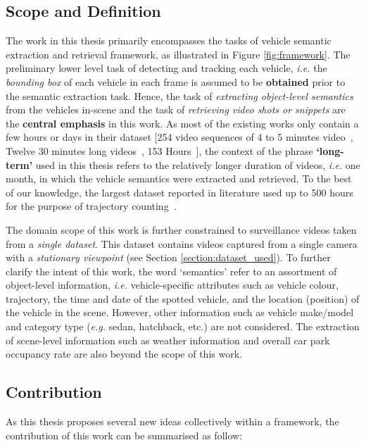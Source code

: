 \subsection{Scope and Definition}
\label{subsec:scope}
The work in this thesis primarily encompasses the tasks 
of vehicle semantic extraction and retrieval framework, as illustrated in Figure \ref{fig:framework}. The preliminary lower level task of detecting and tracking each vehicle, \emph{i.e.} the \textit{bounding box} of each vehicle in each frame is assumed to be \textbf{obtained} prior to the semantic extraction task.
Hence, the task of \textit{extracting object-level semantics} from the vehicles in-scene and the task of \textit{retrieving video shots or snippets} are the \textbf{central emphasis} in this work.
As most of the existing works only contain a few hours or days in their dataset [254 video sequences of 4 to 5 minutes video~\cite{liu2016highway}, Twelve 30 minutes long videos~\cite{marmol2016quickspot}, 153 Hours~\cite{ren2018learning}], the context of the phrase \textbf{`long-term'} used in this thesis refers to the relatively longer duration of videos, \emph{i.e.} one month, in which the vehicle semantics were extracted and retrieved. To the best of our knowledge, the largest dataset reported in literature used up to 500 hours for the purpose of trajectory counting~\cite{lessard2016countingapp}.


The domain scope of this work is further constrained to surveillance videos taken from a \textit{single dataset}. This dataset contains videos captured from a single camera with a \textit{stationary viewpoint} (see Section \ref{section:dataset_used}). To further clarify the intent of this work, the word `semantics' refer to an assortment of object-level information, \emph{i.e.} vehicle-specific attributes such as vehicle colour, trajectory, the time and date of the spotted vehicle, and the location (position) of the vehicle in the scene. However, other information 
such as vehicle make/model and category type (\emph{e.g.} sedan, hatchback, etc.)
are not considered.
The extraction of scene-level information such as weather information %
and overall car park occupancy rate are also beyond the scope of this work.


\subsection{Contribution}
As this thesis proposes several new ideas collectively within a framework, 
the contribution of this work can be summarised as follow:


